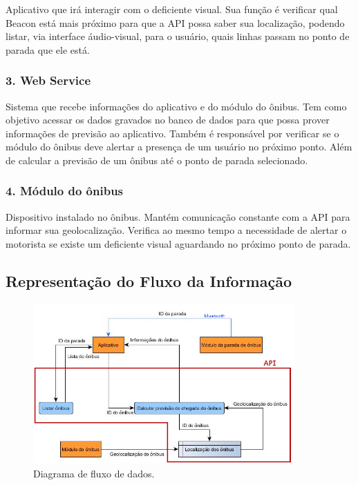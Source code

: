 \documentclass[
	12pt,				%
	oneside,			%
	a4paper,			%
	brazil				%
]{abntex2}
\begin{document}
{Aplicativo que irá interagir com o deficiente visual. Sua função é verificar qual Beacon está mais próximo para que a API possa saber sua localização, podendo listar, via interface áudio-visual, para o usuário, quais linhas passam no ponto de parada que ele está.

\subsubsection*{3. Web Service}

Sistema que recebe informações do aplicativo e do módulo do ônibus. Tem como objetivo acessar os dados gravados no banco de dados para que possa prover informações de previsão ao aplicativo. Também é responsável por verificar se o módulo do ônibus deve alertar a presença de um usuário no próximo ponto. Além de calcular a previsão de um ônibus até o ponto de parada selecionado.

\subsubsection*{4. Módulo do ônibus}

Dispositivo instalado no ônibus. Mantém comunicação constante com a API para informar sua geolocalização. Verifica ao mesmo tempo a necessidade de alertar o motorista se existe um deficiente visual aguardando no próximo ponto de parada.

\newpage

\subsection{Representação do Fluxo da Informação}

\begin{figure}[!h]
\centering
\includegraphics[width=10cm, center]{images/data-flux.png}
\caption{Diagrama de fluxo de dados.}
\label{Rotulo}
\end{figure}

}
\end{document}
